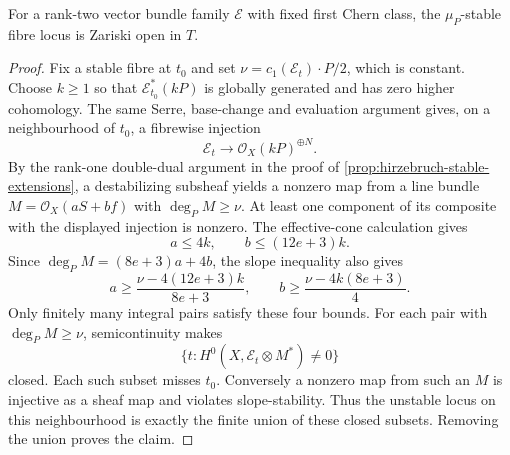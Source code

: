 \begin{lemma}\label{lem:hirzebruch-family-stability-open}
For a rank-two vector bundle family $\mathcal E$ with fixed first Chern
class, the $\mu_P$-stable fibre locus is Zariski open in $T$.
\end{lemma}
\begin{proof}
Fix a stable fibre at $t_0$ and set
$\nu=c_1(\mathcal E_t)\cdot P/2$, which is constant. Choose $k\geq1$
so that $\mathcal E_{t_0}^*(kP)$ is globally generated and has zero
higher cohomology. The same Serre, base-change and evaluation argument
gives, on a neighbourhood of $t_0$, a fibrewise injection
\[
 \mathcal E_t\longrightarrow\mathcal O_X(kP)^{\oplus N}.
\]
By the rank-one double-dual argument in the proof of
\cref{prop:hirzebruch-stable-extensions}, a destabilizing subsheaf yields
a nonzero map from a line bundle $M=\mathcal O_X(aS+bf)$ with
$\deg_P M\geq\nu$. At least one component of its composite with the
displayed injection is nonzero. The effective-cone calculation gives
\[
 a\leq4k,\qquad b\leq(12e+3)k.
\]
Since $\deg_P M=(8e+3)a+4b$, the slope inequality also gives
\[
 a\geq\frac{\nu-4(12e+3)k}{8e+3},
 \qquad b\geq\frac{\nu-4k(8e+3)}4.
\]
Only finitely many integral pairs satisfy these four bounds.
For each pair with $\deg_P M\geq\nu$, semicontinuity makes
\[
 \{t:H^0(X,\mathcal E_t\otimes M^*)\neq0\}
\]
closed. Each such subset misses $t_0$. Conversely a nonzero map from
such an $M$ is injective as a sheaf map and violates slope-stability.
Thus the unstable locus on this neighbourhood is exactly the finite
union of these closed subsets. Removing the union proves the claim.
\end{proof}

